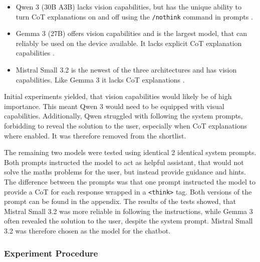 \begin{itemize}
    \item Qwen 3 (30B A3B) lacks vision capabilities, but has the unique ability to turn \ac{CoT} explanations on and off using the \texttt{/nothink} command in prompts \parencite{Qwen2025}.

    \item Gemma 3 (27B) offers vision capabilities and is the largest model, that can reliably be used on the device available. It lacks explicit \ac{CoT} explanation capabilities \parencite{GemmaTeam2025}.

    \item Mistral Small 3.2 is the newest of the three architectures and has vision capabilities. Like Gemma 3 it lacks \ac{CoT} explanations \parencite{Mistral2025}.
\end{itemize}

Initial experiments yielded, that vision capabilities would likely be of high importance. This meant Qwen 3 would need to be equipped with visual capabilities. Additionally, Qwen struggled with following the system prompts, forbidding to reveal the solution to the user, especially when \ac{CoT} explanations where enabled. It was therefore removed from the shortlist.

The remaining two models were tested using identical 2 identical system prompts. Both prompts instructed the model to act as helpful assistant, that would not solve the maths problems for the user, but instead provide guidance and hints. The difference between the prompts was that one prompt instructed the model to provide a \ac{CoT} for each response wrapped in a \texttt{<think>} tag. Both versions of the prompt can be found in the appendix. The results of the tests showed, that Mistral Small 3.2 was more reliable in following the instructions, while Gemma 3 often revealed the solution to the user, despite the system prompt. Mistral Small 3.2 was therefore chosen as the model for the chatbot.

\subsubsection{Experiment Procedure} \label{sssec:experiment_procedure}

